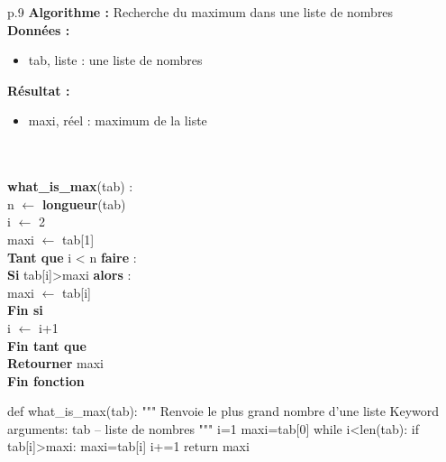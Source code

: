 \documentclass[10pt]{article}
\begin{document}
\begin{minipage}[c]{.48\linewidth}
\begin{pseudo}
\begin{center}
\begin{tabular}{p{.9\textwidth}}
\hline
\textbf{Algorithme :} Recherche du maximum dans une liste de nombres\\
\hline
\textbf{Données :}
\begin{itemize}
\item \textsf{tab}, liste : une liste de nombres
\end{itemize}
\textbf{Résultat :} 
\begin{itemize}
\item \textsf{maxi}, réel : maximum de la liste
\end{itemize} \\
\\
\textbf{what\_is\_max}(\textsf{tab}) :\\
\hspace{.4cm}\textsf{n} $\leftarrow$ \textbf{longueur}(\textsf{tab}) \\
\hspace{.4cm}\textsf{i  $\leftarrow$ 2} \\
\hspace{.4cm}\textsf{maxi  $\leftarrow$ tab[1]} \\
\hspace{.4cm}\textbf{Tant que} \textsf{i < n} \textbf{faire} : \\
\hspace{.8cm}\textbf{Si} \textsf{tab[i]>maxi} \textbf{alors} : \\
\hspace{1.2cm} \textsf{maxi  $\leftarrow$ tab[i]} \\
\hspace{.8cm}\textbf{Fin si} \\
\hspace{.8cm}\textsf{i  $\leftarrow$ i+1} \\
\hspace{.4cm}\textbf{Fin tant que} \\
\hspace{.4cm}\textbf{Retourner} \textsf{maxi}\\
\textbf{Fin fonction} \\
\hline
\end{tabular}
\end{center}
\end{pseudo}
\end{minipage} \hfill
\begin{minipage}[c]{.48\linewidth}
\begin{py}
\begin{python}
def what_is_max(tab):
    """ 
    Renvoie le plus grand nombre d'une liste
    Keyword arguments:
    tab -- liste de nombres 
    """
    i=1
    maxi=tab[0]
    while i<len(tab):
        if tab[i]>maxi:
            maxi=tab[i]
        i+=1
    return maxi
\end{python}
\end{py}
\end{minipage}
\end{document}

